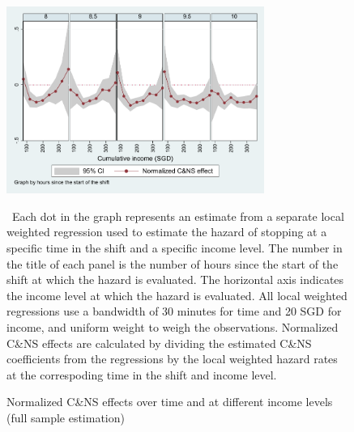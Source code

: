 \documentclass[reviewmode,AEJ]{AEA}
\begin{document}
\begin{figure}
	{\centering
		\caption{Normalized C\&NS effects over time and at different income levels (full sample estimation)} %
		\includegraphics[width=0.75\textwidth]{./fg/cnsmfxulwr80to100normalized.pdf}
		\label{fg:2dulwr}
	}
	\begin{figurenotes}
	\small\ Each dot in the graph represents an estimate from a separate local weighted regression used to estimate the hazard of stopping at a specific time in the shift and a specific income level. The number in the title of each panel is the number of hours since the start of the shift at which the hazard is evaluated. The horizontal axis indicates the income level at which the hazard is evaluated. All local weighted regressions use a bandwidth of 30 minutes for time and 20 SGD for income, and uniform weight to weigh the observations. Normalized C\&NS effects are calculated by dividing the estimated C\&NS coefficients from the regressions by the local weighted hazard rates at the correspoding time in the shift and income level. 
	\end{figurenotes}
\end{figure}

\FloatBarrier
\end{document}
